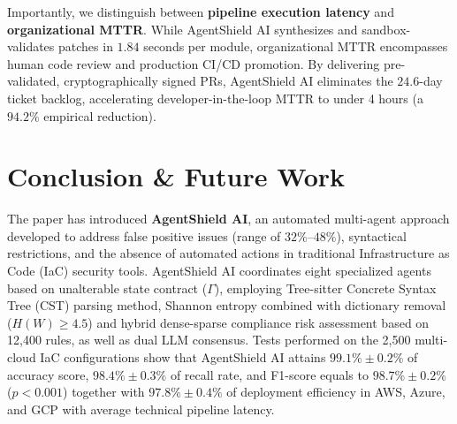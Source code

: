 \documentclass[runningheads]{llncs}
\begin{document}
Importantly, we distinguish between \textbf{pipeline execution latency} and \textbf{organizational MTTR}. While AgentShield AI synthesizes and sandbox-validates patches in $1.84$ seconds per module, organizational MTTR encompasses human code review and production CI/CD promotion. By delivering pre-validated, cryptographically signed PRs, AgentShield AI eliminates the $24.6$-day ticket backlog, accelerating developer-in-the-loop MTTR to under 4 hours (a $94.2\%$ empirical reduction).

\begin{table}[t]
\centering
\caption{Enterprise Cost \& Operational Impact Analysis (1,000 Templates / Month).}
\label{tab:cost}
\setlength{\tabcolsep}{4.5pt}
\end{table}


\section{Conclusion \& Future Work}
The paper has introduced \textbf{AgentShield AI}, an automated multi-agent approach developed to address false positive issues (range of $32\%$--$48\%$), syntactical restrictions, and the absence of automated actions in traditional Infrastructure as Code (IaC) security tools. AgentShield AI coordinates eight specialized agents based on unalterable state contract ($\Gamma$), employing Tree-sitter Concrete Syntax Tree (CST) parsing method, Shannon entropy combined with dictionary removal ($H(W) \ge 4.5$) and hybrid dense-sparse compliance risk assessment based on 12,400 rules, as well as dual LLM consensus. Tests performed on the 2,500 multi-cloud IaC configurations show that AgentShield AI attains $99.1\% \pm 0.2\%$ of accuracy score, $98.4\% \pm 0.3\%$ of recall rate, and F1-score equals to $98.7\% \pm 0.2\%$ ($p < 0.001$) together with $97.8\% \pm 0.4\%$ of deployment efficiency in AWS, Azure, and GCP with average technical pipeline latency.
\end{document}
